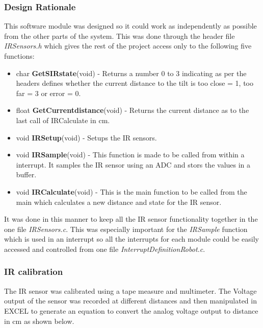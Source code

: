 \documentclass{article}
\begin{document}
\subsubsection{Design Rationale}
This software module was designed so it could work as independently as possible from the other parts of the system. This was done through the header file \textit{IR\textunderscore Sensors.h} which gives the rest of the project access only to the following five functions:

\begin{itemize}
	\item char \textbf{Get\textunderscore S\textunderscore IR\textunderscore state}(void) - Returns a number 0 to 3 indicating as per the headers defines whether the current distance to the tilt is too close = 1, too far = 3 or error = 0.
	\item float \textbf{Get\textunderscore Current\textunderscore distance}(void) -  Returns the current distance as to the last call of IR\textunderscore Calculate in cm.  
	\item void \textbf{IR\textunderscore Setup}(void) - Setups the IR sensors. 
	\item void \textbf{IR\textunderscore  Sample}(void) - This function is made to be called from within a interrupt. It samples the IR sensor using an ADC and stors the values in a buffer. 
	\item void \textbf{IR\textunderscore  Calculate}(void) - This is the main function to be called from the main which calculates a new distance and state for the IR sensor. 
\end{itemize}

It was done in this manner to keep all the IR sensor functionality together in the one file \textit{IR\textunderscore Sensors.c}. This was especially important for the \textit{IR\textunderscore Sample} function which is used in an interrupt so all the interrupts for each module could be easily accessed and controlled from one file \textit{Interrupt\textunderscore Definition\textunderscore Robot.c}.



\subsubsection{IR calibration}
The IR sensor was calibrated using a tape measure and multimeter. The Voltage output of the sensor was recorded at different distances and then manipulated in EXCEL to generate an equation to convert the analog voltage output to distance in cm as shown below. 
\end{document}
